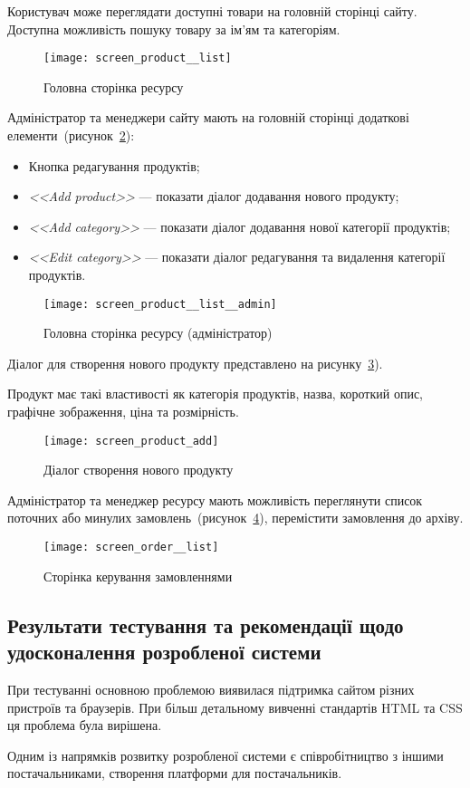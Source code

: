 Користувач може переглядати доступні товари на головній сторінці сайту.
Доступна можливість пошуку товару за ім'ям та категоріям.
\begin{figure}[H]
    \centering
    \texttt{[image: screen\_product\_\_list]}
    \caption{Головна сторінка ресурсу}
    \label{fig:site_product_list}
\end{figure}

Адміністратор та менеджери сайту мають на головній сторінці додаткові елементи~(рисунок~\ref{fig:site_product_list_admin}): 
\begin{itemize}
\item Кнопка редагування продуктів;
\item \textit{<<Add product>>} --- показати діалог додавання нового продукту;
\item \textit{<<Add category>>} --- показати діалог додавання нової категорії продуктів;
\item \textit{<<Edit category>>} --- показати діалог редагування та видалення категорії продуктів.
\end{itemize}
\begin{figure}[H]
    \centering
    \texttt{[image: screen\_product\_\_list\_\_admin]}
    \caption{Головна сторінка ресурсу (адміністратор)}
    \label{fig:site_product_list_admin}
\end{figure}

Діалог для створення нового продукту представлено на рисунку~\ref{fig:site_product_add}).

Продукт має такі властивості як категорія продуктів, назва, короткий опис, графічне зображення, ціна та розмірність.   
\begin{figure}[H]
    \centering
    \texttt{[image: screen\_product\_add]}
    \caption{Діалог створення нового продукту}
    \label{fig:site_product_add}
\end{figure}

Адміністратор та менеджер ресурсу мають можливість переглянути список поточних або минулих замовлень~(рисунок~\ref{fig:site_order_list}), перемістити замовлення до архіву.  
\begin{figure}[H]
    \centering
    \texttt{[image: screen\_order\_\_list]}
    \caption{Сторінка керування замовленнями}
    \label{fig:site_order_list}
\end{figure}

\subsection{Результати тестування та рекомендації щодо удосконалення розробленої системи}
При тестуванні основною проблемою виявилася підтримка сайтом різних пристроїв та браузерів. 
При більш детальному вивченні стандартів HTML та CSS ця проблема була вирішена.

Одним із напрямків розвитку розробленої системи є співробітництво з іншими постачальниками, створення платформи для постачальників. 
